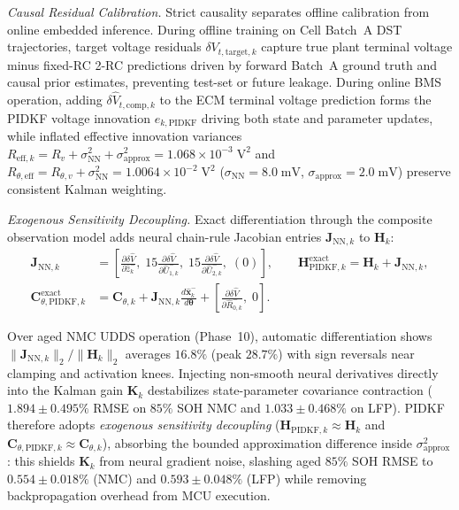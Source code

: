 \documentclass[11pt,a4paper]{article}
\begin{document}
\emph{Causal Residual Calibration.} Strict causality separates offline calibration from online embedded inference. During offline training on Cell Batch~A DST trajectories, target voltage residuals $\delta V_{t,\text{target},k}$ capture true plant terminal voltage minus fixed-RC 2-RC predictions driven by forward Batch~A ground truth and causal prior estimates, preventing test-set or future leakage. During online BMS operation, adding $\delta\hat{V}_{t,\text{comp},k}$ to the ECM terminal voltage prediction forms the PIDKF voltage innovation $e_{k,\text{PIDKF}}$ driving both state and parameter updates, while inflated effective innovation variances $R_{\text{eff},k} = R_v + \sigma_{\text{NN}}^2 + \sigma_{\text{approx}}^2 = 1.068 \times 10^{-3}\;\mathrm{V}^2$ and $R_{\theta,\text{eff}} = R_{\theta,v} + \sigma_{\text{NN}}^2 = 1.0064 \times 10^{-2}\;\mathrm{V}^2$ ($\sigma_{\text{NN}} = 8.0\;\mathrm{mV}$, $\sigma_{\text{approx}} = 2.0\;\mathrm{mV}$) preserve consistent Kalman weighting.

\emph{Exogenous Sensitivity Decoupling.} Exact differentiation through the composite observation model adds neural chain-rule Jacobian entries $\mathbf{J}_{\text{NN},k}$ to $\mathbf{H}_k$:
\begin{align*}
\mathbf{J}_{\text{NN},k} &= \left[\frac{\partial\delta\hat{V}}{\partial\hat{z}_k^-},\; 15\frac{\partial\delta\hat{V}}{\partial\hat{U}_{1,k}^-},\; 15\frac{\partial\delta\hat{V}}{\partial\hat{U}_{2,k}^-},\; (0)\right], \qquad
\mathbf{H}_{\text{PIDKF},k}^{\text{exact}} = \mathbf{H}_k + \mathbf{J}_{\text{NN},k}, \\
\mathbf{C}_{\theta,\text{PIDKF},k}^{\text{exact}} &= \mathbf{C}_{\theta,k} + \mathbf{J}_{\text{NN},k}\frac{d\hat{\mathbf{x}}_k^-}{d\boldsymbol{\theta}} + \left[\frac{\partial \delta\hat{V}}{\partial \hat{R}_{0,k}^-},\; 0\right].
\end{align*}
{\sloppy Over aged NMC UDDS operation (Phase~10), automatic differentiation shows $\|\mathbf{J}_{\text{NN},k}\|_2 / \|\mathbf{H}_k\|_2$ averages $16.8\%$ (peak $28.7\%$) with sign reversals near clamping and activation knees. Injecting non-smooth neural derivatives directly into the Kalman gain $\mathbf{K}_k$ destabilizes state-parameter covariance contraction ($1.894\pm0.495\%$ RMSE on $85\%$ SOH NMC and $1.033\pm0.468\%$ on LFP). PIDKF therefore adopts \emph{exogenous sensitivity decoupling} ($\mathbf{H}_{\text{PIDKF},k} \approx \mathbf{H}_k$ and $\mathbf{C}_{\theta,\text{PIDKF},k} \approx \mathbf{C}_{\theta,k}$), absorbing the bounded approximation difference inside $\sigma_{\text{approx}}^2$: this shields $\mathbf{K}_k$ from neural gradient noise, slashing aged $85\%$ SOH RMSE to $0.554\pm0.018\%$ (NMC) and $0.593\pm0.048\%$ (LFP) while removing backpropagation overhead from MCU execution.\par}
\end{document}
